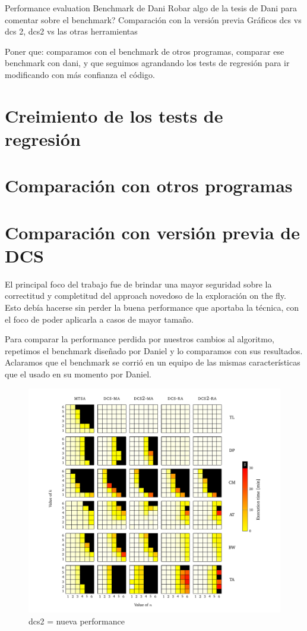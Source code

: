 Performance evaluation
Benchmark de Dani
Robar algo de la tesis de Dani para comentar sobre el benchmark?
Comparación con la versión previa
Gráficos dcs vs dcs 2, dcs2 vs las otras herramientas

Poner que: comparamos con el benchmark de otros programas, comparar ese benchmark con dani, y que seguimos agrandando los tests de regresión para ir modificando con más confianza el código.

\section{Creimiento de los tests de regresión}


\section{Comparación con otros programas}


\section{Comparación con versión previa de DCS}
El principal foco del trabajo fue de brindar una mayor seguridad sobre la correctitud y completitud del approach novedoso de la exploración on the fly. Esto debía hacerse sin perder la buena performance que aportaba la técnica, con el foco de poder aplicarla a casos de mayor tamaño.

Para comparar la performance perdida por nuestros cambios al algoritmo, repetimos el benchmark diseñado por Daniel y lo comparamos con sus resultados. Aclaramos que el benchmark se corrió en un equipo de las mismas características que el usado en su momento por Daniel.

\begin{figure}[htb]
    \centering
    \includegraphics[width=\linewidth]{figures/dcs_vs.pdf}  
    \caption{dcs2 = nueva performance}
    \label{fig:dcs_vs}
\end{figure}


